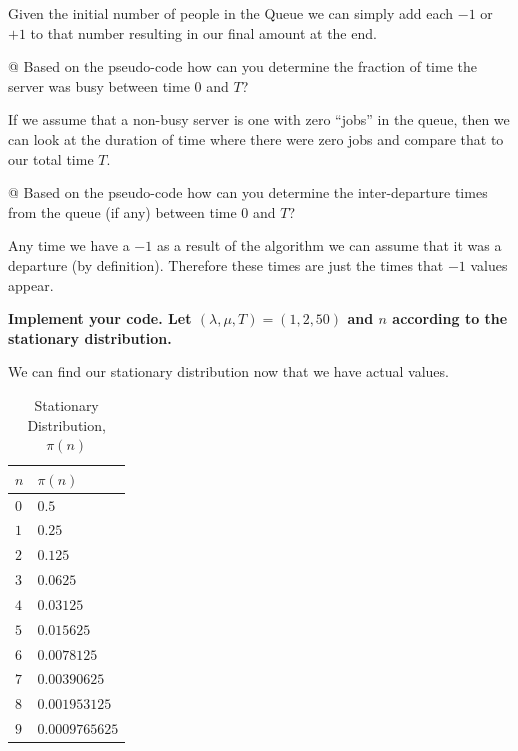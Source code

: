 \documentclass[10pt]{article}
\begin{document}
\begin{easylist}[enumerate]
    Given the initial number of people in the Queue we can simply add each $-1$
    or $+1$ to that number resulting in our final amount at the end.

    \vspace{0.5cm}
    @ Based on the pseudo-code how can you determine the fraction of time the
    server was busy between time $0$ and $T$?
    \vspace{0.5cm}

    If we assume that a non-busy server is one with zero ``jobs'' in the queue,
    then we can look at the duration of time where there were zero jobs and
    compare that to our total time $T$.

    \vspace{0.5cm}
    @ Based on the pseudo-code how can you determine the inter-departure times
    from the queue (if any) between time $0$ and $T$?
    \vspace{0.5cm}

    Any time we have a $-1$ as a result of the algorithm we can assume that it
    was a departure (by definition). Therefore these times are just the times
    that $-1$ values appear.

    \vspace{0.5cm}
    \textbf{Implement your code. Let $(\lambda, \mu, T) = (1, 2, 50)$ and $n$
    according to the stationary distribution.}
    \vspace{0.5cm}

    We can find our stationary distribution now that we have actual values.

    \begin{table}[H]
        \centering
        \begin{tabular}{|l|l|}
            \hline
            $n$ & $\pi(n)$\\
            \hline
            $0$ & $0.5$\\
            $1$ & $0.25$\\
            $2$ & $0.125$\\
            $3$ & $0.0625$\\
            $4$ & $0.03125$\\
            $5$ & $0.015625$\\
            $6$ & $0.0078125$\\
            $7$ & $0.00390625$\\
            $8$ & $0.001953125$\\
            $9$ & $0.0009765625$\\
            \hline
        \end{tabular}
        \caption{Stationary Distribution, $\pi(n)$}
    \end{table}


\end{easylist}
\end{document}
